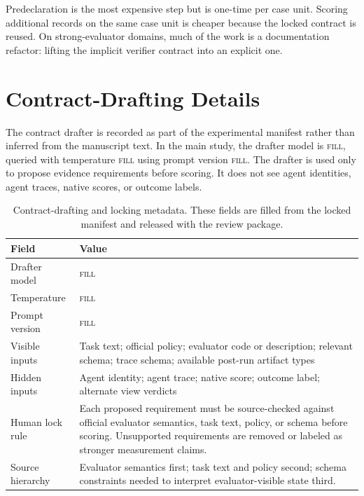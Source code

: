 \documentclass{article}
\newcommand{\fillfromdata}{\textsc{fill}}
\providecommand{\ContractDrafterModel}{\fillfromdata}
\providecommand{\ContractDrafterTemperature}{\fillfromdata}
\providecommand{\ContractPromptVersion}{\fillfromdata}
\begin{document}
Predeclaration is the most expensive step but is one-time per case unit.
Scoring additional records on the same case unit is cheaper because the locked
contract is reused. On strong-evaluator domains, much of the work is a
documentation refactor: lifting the implicit verifier contract into an explicit
one.

\section{Contract-Drafting Details}
\label{app:contract-drafting-details}

The contract drafter is recorded as part of the experimental manifest rather
than inferred from the manuscript text. In the main study, the drafter model is
\ContractDrafterModel, queried with temperature \ContractDrafterTemperature
using prompt version \ContractPromptVersion. The drafter is used only to
propose evidence requirements before scoring. It does not see agent identities,
agent traces, native scores, or outcome labels.

\begin{table}[h]
\centering
\caption{Contract-drafting and locking metadata. These fields are filled from
the locked manifest and released with the review package.}
\label{tab:contract-drafting-metadata}
\footnotesize
\setlength{\tabcolsep}{4pt}
\renewcommand{\arraystretch}{1.14}
\begin{tabularx}{\linewidth}{@{}l X@{}}
\toprule
Field & Value \\
\midrule
Drafter model & \ContractDrafterModel \\
Temperature & \ContractDrafterTemperature \\
Prompt version & \ContractPromptVersion \\
Visible inputs & Task text; official policy; evaluator code or description; relevant schema; trace schema; available post-run artifact types \\
Hidden inputs & Agent identity; agent trace; native score; outcome label; alternate view verdicts \\
Human lock rule & Each proposed requirement must be source-checked against official evaluator semantics, task text, policy, or schema before scoring. Unsupported requirements are removed or labeled as stronger measurement claims. \\
Source hierarchy & Evaluator semantics first; task text and policy second; schema constraints needed to interpret evaluator-visible state third. \\
\bottomrule
\end{tabularx}
\end{table}
\end{document}
